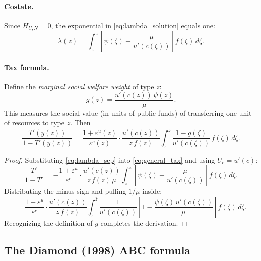 \documentclass[12pt,a4paper]{article}
\theoremstyle{definition}
\theoremstyle{plain}
\theoremstyle{remark}
\newcommand{\zbar}{\bar{z}}
\begin{document}
\paragraph{Costate.} Since $H_{U,N} = 0$, the exponential in \eqref{eq:lambda_solution} equals one:
\begin{equation}
\label{eq:lambda_sep}
  \lambda(z) = \int_{z}^{\zbar} \left[ \psi(\zeta) - \frac{\mu}{u'(c(\zeta))} \right] f(\zeta) \, d\zeta.
\end{equation}

\paragraph{Tax formula.} Define the \emph{marginal social welfare weight} of type $z$:
\begin{equation}
\label{eq:g_weight}
  g(z) = \frac{u'(c(z)) \, \psi(z)}{\mu}.
\end{equation}
This measures the social value (in units of public funds) of transferring one unit of resources to type $z$. Then
\begin{equation}
\label{eq:tax_sep}
  \frac{T'(y(z))}{1 - T'(y(z))}
  = \frac{1 + \varepsilon^u(z)}{\varepsilon^c(z)} \cdot \frac{u'(c(z))}{z \, f(z)}
    \int_{z}^{\zbar} \frac{1 - g(\zeta)}{u'(c(\zeta))} \, f(\zeta) \, d\zeta.
\end{equation}

\begin{proof}
Substituting \eqref{eq:lambda_sep} into \eqref{eq:general_tax} and using $U_c = u'(c)$:
\[
  \frac{T'}{1-T'} = -\frac{1+\varepsilon^u}{\varepsilon^c} \cdot \frac{u'(c(z))}{z \, f(z) \, \mu}
  \int_{z}^{\zbar} \left[ \psi(\zeta) - \frac{\mu}{u'(c(\zeta))} \right] f(\zeta) \, d\zeta.
\]
Distributing the minus sign and pulling $1/\mu$ inside:
\[
  = \frac{1+\varepsilon^u}{\varepsilon^c} \cdot \frac{u'(c(z))}{z \, f(z)}
  \int_{z}^{\zbar} \frac{1}{u'(c(\zeta))} \left[ 1 - \frac{\psi(\zeta) \, u'(c(\zeta))}{\mu} \right] f(\zeta) \, d\zeta.
\]
Recognizing the definition of $g$ completes the derivation.
\end{proof}

\subsection{The Diamond (1998) ABC formula}
\end{document}
